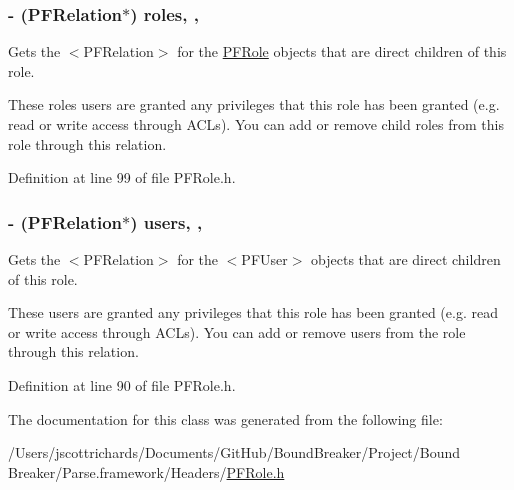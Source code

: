 \hypertarget{interface_p_f_role_abb4c019b60e2065df9bf16636bab7d1d}{}
\subsubsection[{roles}]{\setlength{\rightskip}{0pt plus 5cm}-\/ ({\bf P\+F\+Relation}$\ast$) roles\hspace{0.3cm}{\ttfamily [read]}, {\ttfamily [nonatomic]}, {\ttfamily [strong]}}\label{interface_p_f_role_abb4c019b60e2065df9bf16636bab7d1d}
Gets the $<$\+P\+F\+Relation$>$ for the {\ttfamily \hyperlink{interface_p_f_role}{P\+F\+Role}} objects that are direct children of this role.

These roles\textquotesingle{} users are granted any privileges that this role has been granted (e.\+g. read or write access through A\+C\+Ls). You can add or remove child roles from this role through this relation. 

Definition at line 99 of file P\+F\+Role.\+h.

\hypertarget{interface_p_f_role_a32309ad1b427b9d002e5487054e8ba91}{}
\subsubsection[{users}]{\setlength{\rightskip}{0pt plus 5cm}-\/ ({\bf P\+F\+Relation}$\ast$) users\hspace{0.3cm}{\ttfamily [read]}, {\ttfamily [nonatomic]}, {\ttfamily [strong]}}\label{interface_p_f_role_a32309ad1b427b9d002e5487054e8ba91}
Gets the $<$\+P\+F\+Relation$>$ for the $<$\+P\+F\+User$>$ objects that are direct children of this role.

These users are granted any privileges that this role has been granted (e.\+g. read or write access through A\+C\+Ls). You can add or remove users from the role through this relation. 

Definition at line 90 of file P\+F\+Role.\+h.



The documentation for this class was generated from the following file\+:\begin{DoxyCompactItemize}
\item 
/\+Users/jscottrichards/\+Documents/\+Git\+Hub/\+Bound\+Breaker/\+Project/\+Bound Breaker/\+Parse.\+framework/\+Headers/\hyperlink{_p_f_role_8h}{P\+F\+Role.\+h}\end{DoxyCompactItemize}
